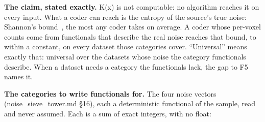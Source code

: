 \textbf{The claim, stated exactly.} K(x) is not computable: no algorithm reaches it on every input. What a coder can reach is the entropy of the source's true noise: Shannon's bound~\cite{src:Shannon}, the most any coder takes on average. A coder whose per-voxel counts come from functionals that describe the real noise reaches that bound, to within a constant, on every dataset those categories cover. “Universal” means exactly that: universal over the datasets whose noise the category functionals describe. When a dataset needs a category the functionals lack, the gap to F5 names it.

\textbf{The categories to write functionals for.} The four noise vectors (noise\_\allowbreak{}sieve\_\allowbreak{}tower.md §16), each a deterministic functional of the sample, read and never assumed. Each is a sum of exact integers, with no float:

